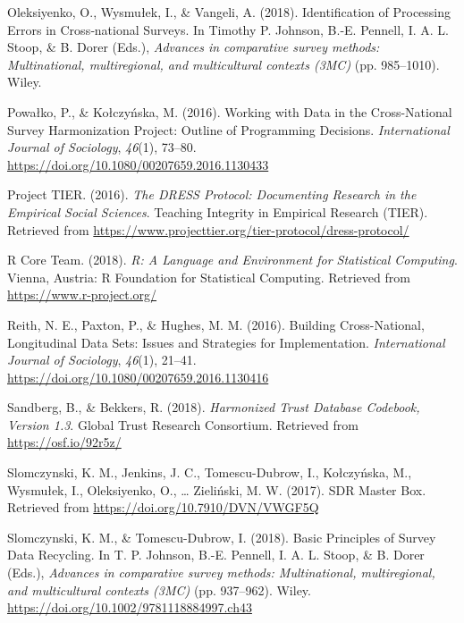 \documentclass[12pt,]{article}
\begin{document}
\leavevmode\hypertarget{ref-Oleksiyenko2018}{}%
Oleksiyenko, O., Wysmułek, I., \& Vangeli, A. (2018). Identification of Processing Errors in Cross‐national Surveys. In Timothy P. Johnson, B.-E. Pennell, I. A. L. Stoop, \& B. Dorer (Eds.), \emph{Advances in comparative survey methods: Multinational, multiregional, and multicultural contexts (3MC)} (pp. 985--1010). Wiley.

\leavevmode\hypertarget{ref-Powako2016}{}%
Powałko, P., \& Kołczyńska, M. (2016). Working with Data in the Cross-National Survey Harmonization Project: Outline of Programming Decisions. \emph{International Journal of Sociology}, \emph{46}(1), 73--80. \url{https://doi.org/10.1080/00207659.2016.1130433}

\leavevmode\hypertarget{ref-ProjectTIER2016}{}%
Project TIER. (2016). \emph{The DRESS Protocol: Documenting Research in the Empirical Social Sciences}. Teaching Integrity in Empirical Research (TIER). Retrieved from \url{https://www.projecttier.org/tier-protocol/dress-protocol/}

\leavevmode\hypertarget{ref-baser}{}%
R Core Team. (2018). \emph{R: A Language and Environment for Statistical Computing}. Vienna, Austria: R Foundation for Statistical Computing. Retrieved from \url{https://www.r-project.org/}

\leavevmode\hypertarget{ref-Reith2016}{}%
Reith, N. E., Paxton, P., \& Hughes, M. M. (2016). Building Cross-National, Longitudinal Data Sets: Issues and Strategies for Implementation. \emph{International Journal of Sociology}, \emph{46}(1), 21--41. \url{https://doi.org/10.1080/00207659.2016.1130416}

\leavevmode\hypertarget{ref-Sandberg2018}{}%
Sandberg, B., \& Bekkers, R. (2018). \emph{Harmonized Trust Database Codebook, Version 1.3}. Global Trust Research Consortium. Retrieved from \url{https://osf.io/92r5z/}

\leavevmode\hypertarget{ref-Slomczynskietal2017}{}%
Slomczynski, K. M., Jenkins, J. C., Tomescu-Dubrow, I., Kołczyńska, M., Wysmułek, I., Oleksiyenko, O., \ldots{} Zieliński, M. W. (2017). SDR Master Box. Retrieved from \url{https://doi.org/10.7910/DVN/VWGF5Q}

\leavevmode\hypertarget{ref-Slomczynski2018}{}%
Slomczynski, K. M., \& Tomescu-Dubrow, I. (2018). Basic Principles of Survey Data Recycling. In T. P. Johnson, B.-E. Pennell, I. A. L. Stoop, \& B. Dorer (Eds.), \emph{Advances in comparative survey methods: Multinational, multiregional, and multicultural contexts (3MC)} (pp. 937--962). Wiley. \url{https://doi.org/10.1002/9781118884997.ch43}
\end{document}
